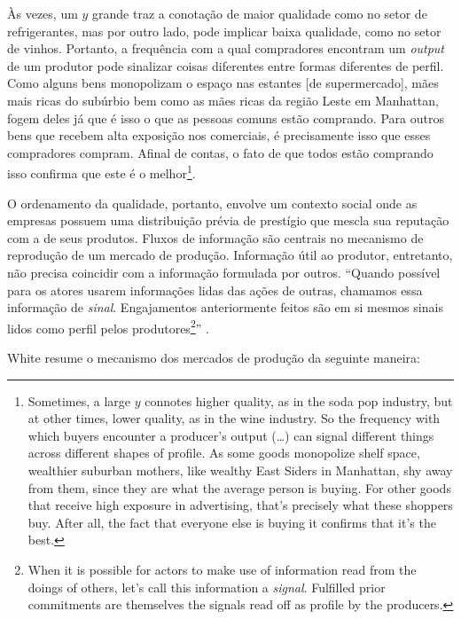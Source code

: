 \documentclass[a4paper, 12pt, openright, oneside, german, french, english, brazil]{abntex2}
\begin{document}
	\begin{citacao}
		Às vezes, um $y$ grande traz a conotação de maior qualidade como no setor de refrigerantes, mas por outro lado, pode implicar baixa qualidade, como no setor de vinhos. Portanto, a frequência com a qual compradores encontram um \textit{output} de um produtor pode sinalizar coisas diferentes entre formas diferentes de perfil. Como alguns bens monopolizam o espaço nas estantes [de supermercado], mães mais ricas do subúrbio bem como as mães ricas da região Leste em Manhattan, fogem deles já que é isso o que as pessoas comuns estão comprando. Para outros bens que recebem alta exposição nos comerciais, é precisamente isso que esses compradores compram. Afinal de contas, o fato de que todos estão comprando isso confirma que este é o melhor\footnote{Sometimes, a large $y$ connotes higher quality, as in the soda pop industry, but at other times, lower quality, as in the wine industry. So the frequency with which buyers encounter a producer's output (\dots) can signal different things across different shapes of profile. As some goods monopolize shelf space, wealthier suburban mothers, like wealthy East Siders in Manhattan, shy away from them, since they are what the average person is buying. For other goods that receive high exposure in advertising, that's precisely what these shoppers buy. After all, the fact that everyone else is buying it confirms that it's the best.}. \cite[p. 15]{white2002markets}
	\end{citacao}
	
	O ordenamento da qualidade, portanto, envolve um contexto social onde as empresas possuem uma distribuição prévia de prestígio que mescla sua reputação com a de seus produtos. Fluxos de informação são centrais no mecanismo de reprodução de um mercado de produção. Informação útil ao produtor, entretanto, não precisa coincidir com a informação formulada por outros. ``Quando possível para os atores usarem informações lidas das ações de outras, chamamos essa informação de \textit{sinal}. Engajamentos anteriormente feitos são em si mesmos sinais lidos como perfil pelos produtores\footnote{When it is possible for actors to make use of information read from the doings of others, let's call this information a \textit{signal}. Fulfilled prior commitments are themselves the signals read off as profile by the producers.}'' \cite[p. 16]{white2002markets}.
	
	White resume o mecanismo dos mercados de produção da seguinte maneira:
	
\end{document}
